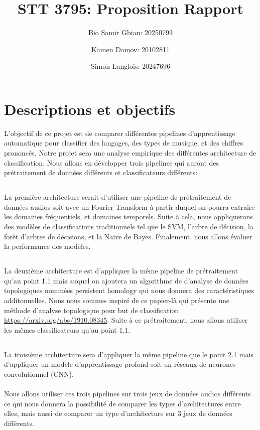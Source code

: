 \documentclass{article}
\title{STT 3795: Proposition Rapport}
\author{Bio Samir Gbian: 20250793}
\author{Kamen Damov: 20102811}
\author{Simon Langlois: 20247696}
\affil{Département de mathématiques et statistiques}
\affil{Université de Montréal}
\begin{document}
\maketitle
\section{Descriptions et objectifs}
L'objectif de ce projet est de comparer différentes pipelines d'apprentissage automatique pour classifier des langages, des types de musique, et des chiffres prononcés. Notre projet sera une analyse empirique des différentes architecture de classification. Nous allons en développer trois pipelines qui auront des prétraitement de données différents et classificateurs différents:
\subsection{}
La première architecture serait d'utiliser une pipeline de prétraitement de données audios soit avec un Fourier Transform à partir duquel on pourra extraire les domaines fréquentiels, et domaines temporels. Suite à cela, nous appliquerons des modèles de classifications traditionnels tel que le SVM, l'arbre de décision, la forêt d'arbres de décisions, et la Naive de Bayes. Finalement, nous allons évaluer la performance des modèles. 
\subsection{}
La deuxième architecture est d'appliquer la même pipeline de prétraitement qu'au point 1.1 mais auquel on ajoutera un algorithme de d'analyse de données topologiques nommées persistent homology qui nous donnera des caractéristiques additonnelles. Nous nous sommes inspiré de ce papier-là qui présente une méthode d'analyse topologique pour but de classification \url{https://arxiv.org/abs/1910.08345}. Suite à ce prétraitement, nous allons utiliser les mêmes classificateurs qu'au point 1.1.
\subsection{}
La troisième architecture sera d'appliquer la même pipeline que le point 2.1 mais d'appliquer un modèle d'apprentissage profond soit un réseaux de neurones convolutionnel (CNN).\\\\
Nous allons utiliser ces trois pipelines sur trois jeux de données audios différents ce qui nous donnera la possibilité de comparer les types d'architectures entre elles, mais aussi de comparer un type d'architecture sur 3 jeux de données différents. 
\end{document}
